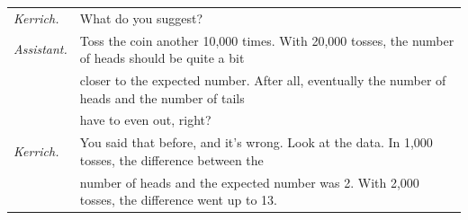 \documentclass[10pt]{article}
\begin{document}
{\begin{tabular}{ll}
\textit{Kerrich.} & What do you suggest?\\[3pt]
\textit{Assistant.} & Toss the coin another 10,000 times.  With 20,000 tosses, the number of heads should be quite a bit \\
   & closer to the expected number.  After all, eventually the number of heads and the number of tails  \\
  & have to even out, right?\\[3pt]
\textit{Kerrich.} & You said that before, and it's wrong.  Look at the data.  
    In 1,000 tosses, the difference between the\\
 &  number of heads and the expected number was 2.  With 2,000 tosses, the 
    difference went up to 13.\\[3pt]
\end{tabular}
\vfill
\eject
{\ }

}
\end{document}
